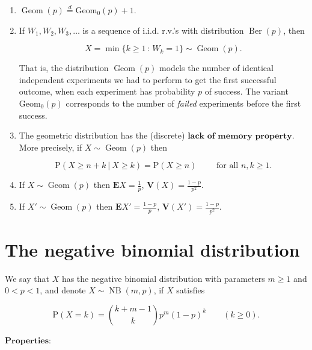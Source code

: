 \documentclass[11pt]{report}
\theoremstyle{plain}
\theoremstyle{definition}
\begin{document}
\begin{enumerate}[label=\arabic*.]
\item $\operatorname{Geom}(p) \stackrel{d}{=}
\operatorname{Geom_0}(p) + 1$.

\item If $W_1,W_2,W_3, \ldots$ is a sequence of i.i.d.
r.v.'s with distribution $\operatorname{Ber}(p)$,
then

\[
X = \min\{ k\ge 1\,:\, W_k = 1\}  \sim \operatorname{Geom}(p).
\]

\noindent That is, the distribution $\operatorname{Geom}(p)$
models the number of identical independent experiments
we had to perform to get the first successful outcome,
when each experiment has probability $p$ of success.
The variant $\operatorname{Geom_0}(p)$ corresponds to
the number of \emph{failed} experiments before the first
success.

\item The geometric distribution has the (discrete)
$\textbf{lack of memory property}$. More precisely,
if $X \sim \operatorname{Geom}(p)$ then

\[
\mathrm{P}(X \ge n+k \ |\ X \ge k) = \mathrm{P}(X \ge n)\qquad \textrm{ for all $n,k\ge 1$}.
\]

\item If $X\sim \operatorname{Geom}(p)$ then
$\mathbf{E} X = \frac1p$,
$\mathbf{V}(X) = \frac{1-p}{p^2}$.

\item If $X'\sim \operatorname{Geom}(p)$ then
$\mathbf{E} X' = \frac{1-p}{p}$,
$\mathbf{V}(X') = \frac{1-p}{p^2}$.
\end{enumerate}

\section{The negative binomial distribution}

We say that $X$ has the negative binomial
distribution with parameters $m\ge1$ and $0<p<1$, and
denote $X\sim \operatorname{NB}(m,p)$, if $X$
satisfies

\[
\mathrm{P}(X=k) = \binom{k+m-1}{k} p^m (1-p)^k \qquad (k\ge 0).
\]

\noindent $\textbf{Properties:}$
\end{document}
